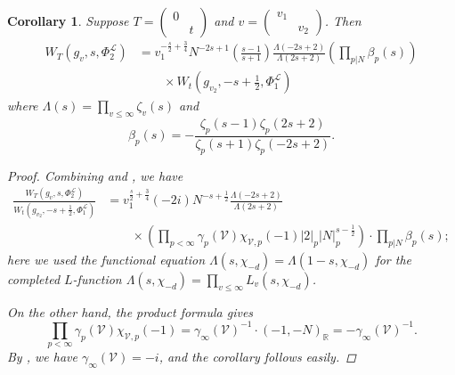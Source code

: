 \documentclass[reqno,oneside]{amsart}
\theoremstyle{plain}
\newtheorem{corollary}[theorem]{Corollary}
\theoremstyle{remark}
\numberwithin{theorem}{section}
\newcommand{\bbR}{\mathbb R}
\newcommand{\calL}{\mathcal L}
\newcommand{\calV}{\mathcal V}
\newcommand{\psm}[1]{\left( \begin{smallmatrix}#1 \end{smallmatrix} \right)}
\begin{document}
	\begin{corollary}
		Suppose $T = \psm{0 & \\ & t}$ and $v =\psm{v_1 & \\ & v_2}$. Then
		\begin{equation}
		\begin{aligned}
		W_T(g_v, s, \Phi^{\calL}_{2}) &=  v_1^{-\frac{s}{2} + \frac34} N^{-2s +1 }  \left( \frac{s-1}{s+1} \right)  \frac{\Lambda(-2s+2)}{\Lambda(2s+2)} \left( \prod_{p|N} \beta_p(s)\right)  \\
		& \qquad \times W_{t}(g_{v_2}, -s+\tfrac12, \Phi^{\calL}_1)
		\end{aligned}
		\end{equation}
		where $\Lambda(s) = \prod_{v \leq \infty} \zeta_v(s)$ and
		\begin{equation}
		\beta_p(s) = - \frac{ \zeta_p(s-1) \zeta_p(2s+2) }{\zeta_p(s+1) \zeta_p(-2s+2)}.
		\end{equation}
		\begin{proof}
			Combining   and , we have
			\begin{equation}
			\begin{aligned}
			\frac{W_{T}(g_{v}, s, \Phi^{\calL}_2) }{W_t(g_{v_2}, -s + \frac12, \Phi^{\calL}_1)} &= v_1^{\frac{s}2 + \frac34}  (-2i)  N^{-s + \frac12} \frac{\Lambda(-2s + 2)}{\Lambda(2s+2)} \\
			& \qquad \times \left( \prod_{p < \infty} \gamma_p(\calV) \chi_{\calV, p}(-1) |2|_p |N|_p^{s-\tfrac12} \right) \cdot \prod_{p|N}  \beta_p(s);
			\end{aligned}
			\end{equation}
			here we used the functional equation $\Lambda(s, \chi_{-d}) = \Lambda(1-s, \chi_{-d})$ for the completed $L$-function $\Lambda(s, \chi_{-d}) = \prod_{v \leq \infty} L_v(s, \chi_{-d})$.
			
			On the other hand, the product formula gives
			\begin{equation}
			\prod_{p<\infty} \gamma_p(\calV) \chi_{\calV, p}(-1) = \gamma_{\infty}(\calV)^{-1}
			\cdot (-1, -N)_{\bbR} = - \gamma_{\infty}(\calV)^{-1}.
			\end{equation}
			By \cite[p.\ 330]{KRYbook}, we have $\gamma_{\infty}(\calV) = -i$, and the corollary follows easily.
		\end{proof}
		
		
	\end{corollary}
	
\end{document}
